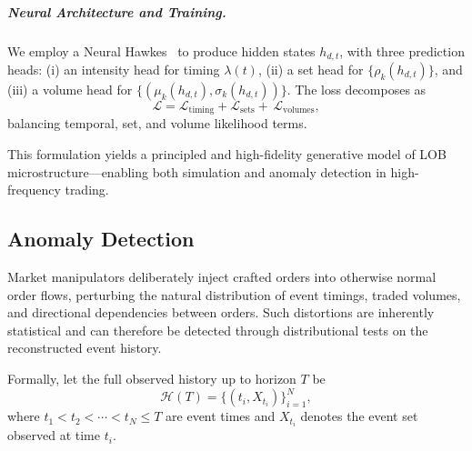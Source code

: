 
\subparagraph{Neural Architecture and Training.}
We employ a Neural Hawkes~\cite{Mei2017TheProcess} to produce hidden states $h_{d,t}$, with three prediction heads:
(i) an intensity head for timing $\lambda(t)$, 
(ii) a set head for $\{\rho_k(h_{d,t})\}$, and 
(iii) a volume head for $\{(\mu_k(h_{d,t}),\sigma_k(h_{d,t}))\}$.  
The loss decomposes as
\[
\mathcal{L} = \mathcal{L}_{\text{timing}} + \mathcal{L}_{\text{sets}} +  \,\mathcal{L}_{\text{volumes}},
\]
balancing temporal, set, and volume likelihood terms.

This formulation yields a principled and high-fidelity generative model of LOB microstructure—enabling both simulation and anomaly detection in high-frequency trading.


\subsection{Anomaly Detection}

Market manipulators deliberately inject crafted orders into otherwise normal order flows, perturbing the natural distribution of event timings, traded volumes, and directional dependencies between orders. Such distortions are inherently statistical and can therefore be detected through distributional tests on the reconstructed event history.

Formally, let the full observed history up to horizon $T$ be
\[
\mathcal{H}(T)
= \{(t_i, X_{t_i})\}_{i=1}^{N},
\]
where $t_1 < t_2 < \cdots < t_N \le T$ are event times and $X_{t_i}$ denotes the event set observed at time $t_i$.

